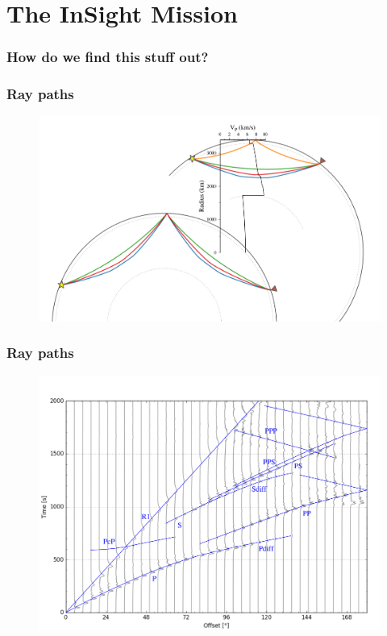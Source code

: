 \documentclass[compress,framenumber]{beamer}
\begin{document}
\section{The InSight Mission}

\begin{frame}
  \frametitle{How do we find this stuff out?}

\end{frame}

\begin{frame}
  \frametitle{Ray paths}
  \vspace{-4.0em}
  \begin{figure}
    \includegraphics[width=0.95\linewidth]{figures/ray_paths.pdf}
  \end{figure}
\end{frame}

\begin{frame}
  \frametitle{Ray paths}
  \vspace{-4.0em}
  \begin{figure}
    \includegraphics[width=0.95\linewidth]{figures/record_section.pdf}
  \end{figure}
\end{frame}
\end{document}
